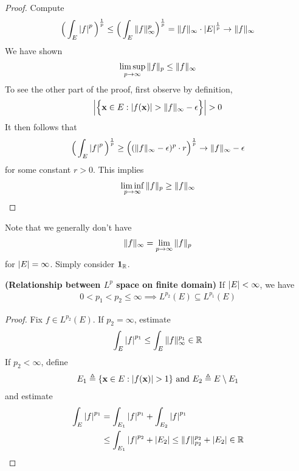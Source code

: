 \documentclass{report}
\begin{document}
\begin{proof}
Compute 
\begin{align*}
\Big(\int_E \left|f\right|^p \Big)^{\frac{1}{p}}\leq \Big(\int_E \| f \|_{\infty}^p \Big)^{\frac{1}{p}}= \| f \|_{\infty} \cdot \left|E\right|^{\frac{1}{p}} \to \| f \|_{\infty}
\end{align*}
We have shown 
\begin{align*}
\limsup_{p\to\infty} \| f \|_p \leq \| f \|_\infty
\end{align*}
To see the other part of the proof, first observe by definition,  
\begin{align*}
\abso{\bset{\textbf{x} \in E: \abso{f(\textbf{x})}> \norm{f}_\infty -\epsilon }}> 0
\end{align*}
It then follows that 
\begin{align*}
\Big(\int_E \left|f\right|^{p} \Big)^{\frac{1}{p}}\geq \Big( (\| f \|_\infty -\epsilon)^p \cdot r  \Big)^{\frac{1}{p}} \to \| f \|_{\infty} - \epsilon 
\end{align*}
for some constant $r>0$. This implies 
\begin{align*}
\liminf_{p\to\infty} \| f \|_p \geq \| f \|_\infty
\end{align*}
\end{proof}
\begin{mdframed}
Note that we generally don't have 
\begin{align*}
\| f \|_\infty = \lim_{p\to \infty} \| f \|_p
\end{align*}
for $\left|E\right|=\infty$. Simply consider $\textbf{1}_{\mathbb{R}}$. 
\end{mdframed}
\begin{theorem}
\label{RbLp}
\textbf{(Relationship between $L^p$ space on finite domain)} If $\left|E\right|< \infty$, we have 
\begin{align*}
0< p_1<p_2\leq \infty \implies   L^{p_2}(E)\subseteq L^{p_1}(E)
\end{align*}
\end{theorem}
\begin{proof}
Fix $f\in L^{p_2}(E)$. If $p_2=\infty$, estimate 
\begin{align*}
\int_E \left|f\right|^{p_1}\leq \int_E \| f \|_{\infty}^{p_1}\in\mathbb{R}
\end{align*}
If $p_2<\infty$, define 
\begin{align*}
  E_1 \triangleq \set{\textbf{x}\in E: \abso{f(\textbf{x})}>1}\text{ and }E_2\triangleq E \setminus E_1
\end{align*}
and estimate 
\begin{align*}
  \int_E \left|f\right|^{p_1}&= \int_{E_1} \left|f\right|^{p_1} + \int_{E_2} \left|f\right|^{p_1} \\
 &\leq \int_{E_1} \left|f\right|^{p_2} + \left|E_2\right|\leq \| f \|_{p_2}^{p_2} + \left|E_2\right|\in\mathbb{R}
\end{align*}
\end{proof}
\end{document}

